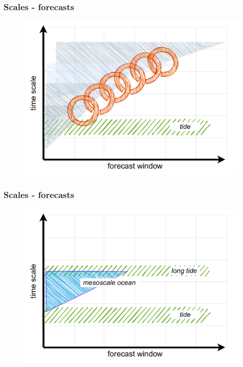 \begin{frame}
\frametitle{Scales - forecasts}
    \begin{figure}      
     \includegraphics[width=\textwidth]{figures/diagrams/scales_with_chain.pdf}
    \end{figure} 
\end{frame}
\begin{frame}
\frametitle{Scales - forecasts}
    \begin{figure}      
     \includegraphics[width=\textwidth]{figures/diagrams/scales_focus.pdf}
    \end{figure} 
\end{frame}

